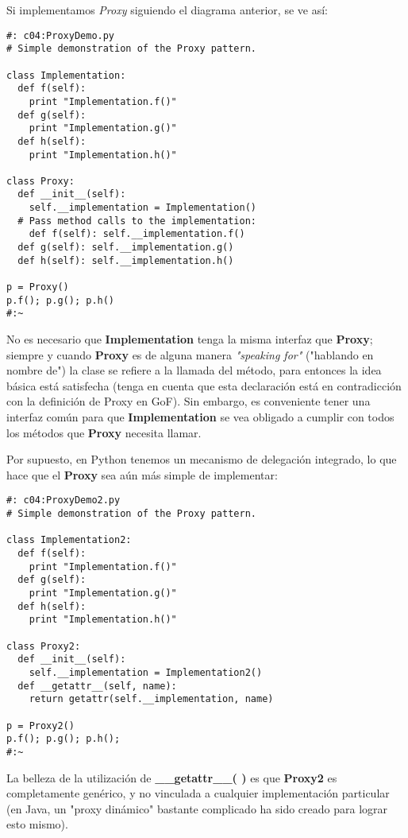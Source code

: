 Si implementamos \textit{Proxy} siguiendo el diagrama anterior, se ve así:

 \begin{lstlisting} 
#: c04:ProxyDemo.py 
# Simple demonstration of the Proxy pattern. 

class Implementation: 
  def f(self):  
    print "Implementation.f()" 
  def g(self):  
    print "Implementation.g()"  
  def h(self):  
    print "Implementation.h()" 
    
class Proxy: 
  def __init__(self):  
    self.__implementation = Implementation()  
  # Pass method calls to the implementation: 
    def f(self): self.__implementation.f()  
  def g(self): self.__implementation.g()  
  def h(self): self.__implementation.h()  
  
p = Proxy() 
p.f(); p.g(); p.h() 
#:~ 
 \end{lstlisting}
 
No es necesario que \textbf{Implementation} tenga la misma interfaz que \textbf{Proxy}; siempre y cuando \textbf{Proxy} es de alguna manera \textit{ "speaking for"} ("hablando en nombre de") la clase se refiere a la llamada del método, para entonces la idea básica está satisfecha (tenga en cuenta que esta declaración está en contradicción con la definición de Proxy en GoF). Sin embargo, es conveniente tener una interfaz común para que \textbf{Implementation} se vea obligado a cumplir con todos los métodos que \textbf{Proxy} necesita llamar. \newline
	
Por supuesto, en Python tenemos un mecanismo de delegación integrado, lo que hace que el \textbf{Proxy} sea aún más simple de implementar:   \newline

\begin{lstlisting} 
#: c04:ProxyDemo2.py 
# Simple demonstration of the Proxy pattern. 

class Implementation2: 
  def f(self):  
    print "Implementation.f()" 
  def g(self):  
    print "Implementation.g()"  
  def h(self):  
    print "Implementation.h()" 
    
class Proxy2: 
  def __init__(self):  
    self.__implementation = Implementation2()  
  def __getattr__(self, name): 
    return getattr(self.__implementation, name) 
    
p = Proxy2() 
p.f(); p.g(); p.h(); 
#:~ 
\end{lstlisting}

La belleza de la utilización de  \textbf{\_\_getattr\_\_( )} es que \textbf{Proxy2} es completamente genérico, y no vinculada a cualquier implementación particular (en Java, un "proxy dinámico" bastante complicado ha sido creado para lograr esto mismo). 

